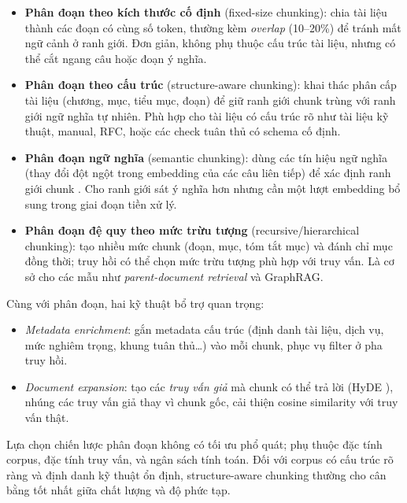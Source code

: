 \begin{itemize}
  \item \textbf{Phân đoạn theo kích thước cố định} (fixed-size chunking): chia tài liệu thành các đoạn có cùng số token, thường kèm \textit{overlap} (10--20\%) để tránh mất ngữ cảnh ở ranh giới. Đơn giản, không phụ thuộc cấu trúc tài liệu, nhưng có thể cắt ngang câu hoặc đoạn ý nghĩa.
  \item \textbf{Phân đoạn theo cấu trúc} (structure-aware chunking): khai thác phân cấp tài liệu (chương, mục, tiểu mục, đoạn) để giữ ranh giới chunk trùng với ranh giới ngữ nghĩa tự nhiên. Phù hợp cho tài liệu có cấu trúc rõ như tài liệu kỹ thuật, manual, RFC, hoặc các check tuân thủ có schema cố định.
  \item \textbf{Phân đoạn ngữ nghĩa} (semantic chunking): dùng các tín hiệu ngữ nghĩa (thay đổi đột ngột trong embedding của các câu liên tiếp) để xác định ranh giới chunk \cite{kamradt_semantic_chunking_2024}. Cho ranh giới sát ý nghĩa hơn nhưng cần một lượt embedding bổ sung trong giai đoạn tiền xử lý.
  \item \textbf{Phân đoạn đệ quy theo mức trừu tượng} (recursive/hierarchical chunking): tạo nhiều mức chunk (đoạn, mục, tóm tắt mục) và đánh chỉ mục đồng thời; truy hồi có thể chọn mức trừu tượng phù hợp với truy vấn. Là cơ sở cho các mẫu như \textit{parent-document retrieval} và GraphRAG.
\end{itemize}

Cùng với phân đoạn, hai kỹ thuật bổ trợ quan trọng:
\begin{itemize}
  \item \textit{Metadata enrichment}: gắn metadata cấu trúc (định danh tài liệu, dịch vụ, mức nghiêm trọng, khung tuân thủ\dots) vào mỗi chunk, phục vụ filter ở pha truy hồi.
  \item \textit{Document expansion}: tạo các \textit{truy vấn giả} mà chunk có thể trả lời (HyDE \cite{gao_hyde_2023}), nhúng các truy vấn giả thay vì chunk gốc, cải thiện cosine similarity với truy vấn thật.
\end{itemize}

Lựa chọn chiến lược phân đoạn không có tối ưu phổ quát; phụ thuộc đặc tính corpus, đặc tính truy vấn, và ngân sách tính toán. Đối với corpus có cấu trúc rõ ràng và định danh kỹ thuật ổn định, structure-aware chunking thường cho cân bằng tốt nhất giữa chất lượng và độ phức tạp.


